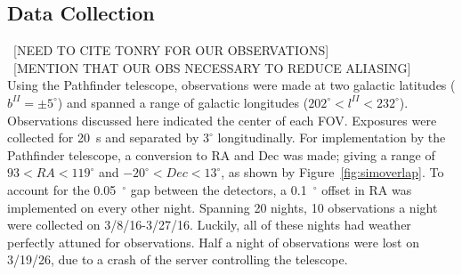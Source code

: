\documentclass[aps,prb,twocolumn,superscriptaddress]{revtex4-1}
\begin{document}
\subsection{Data Collection}\label{sec:data}
\iffalse
	\begin{itemize}
	 \item{} split observations into 1 $deg^2$ chunks
	 \item{} isolated groups s.t. each one is a star with 12 or more obs
	 \item{} $--$ more than 12 detections to be a star
	 \item{} $--$ any sq deg that has more than one star
	 \item{} this reduced 1300 $deg^2$ observation data down to ~300
	 \item{} before variability params: 1531417 stars in field
	 \item{} for variability parameters
	 \item{} $--$ log(average(upper quartile)) - log(average(lower quartile))
	 \item{} $--$ expect variation to go at .2* mag (from sqrt noise)...so subtract .2mag to get the logritmic statistic
	 \item{} sorted biggest (most variable?) to smallest (least variable?)
	\end{itemize}
\fi

~[NEED TO CITE TONRY FOR OUR OBSERVATIONS]\\
~[MENTION THAT OUR OBS NECESSARY TO REDUCE ALIASING]\\

Using the Pathfinder telescope, observations were made at two galactic latitudes ($b^{II}=\pm5^{\circ}$) and spanned a range of galactic longitudes ($202^{\circ} < l^{II} < 232^{\circ}$).  Observations discussed here indicated the center of each FOV.  
Exposures were collected for 20~s and separated by $3^{\circ}$ longitudinally.  For implementation by the Pathfinder telescope, a conversion to RA and Dec was made; giving a range of $93 < RA < 119^{\circ}$ and $-20^{\circ} < Dec < 13^{\circ}$, as shown by Figure~\ref{fig:simoverlap}.  To account for the 0.05~$^{\circ}$ gap between the detectors, a 0.1~$^{\circ}$ offset in RA was implemented on every other night.  
Spanning 20 nights, 10 observations a night were collected on 3/8/16-3/27/16.  Luckily, all of these nights had weather perfectly attuned for observations.  Half a night of observations were lost on 3/19/26, due to a crash of the server controlling the telescope.
\end{document}
